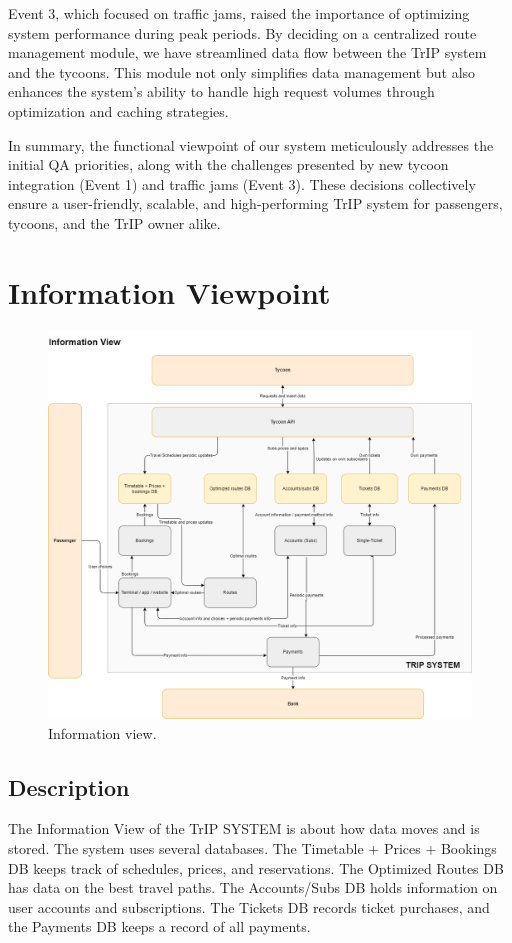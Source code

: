 Event 3, which focused on traffic jams, raised the importance of optimizing system performance during peak periods. By deciding on a centralized route management module, we have streamlined data flow between the TrIP system and the tycoons. This module not only simplifies data management but also enhances the system's ability to handle high request volumes through optimization and caching strategies.

In summary, the functional viewpoint of our system meticulously addresses the initial QA priorities, along with the challenges presented by new tycoon integration (Event 1) and traffic jams (Event 3). These decisions collectively ensure a user-friendly, scalable, and high-performing TrIP system for passengers, tycoons, and the TrIP owner alike.




\section{Information Viewpoint}

\begin{figure}[H]
    \centering
    \includegraphics[width=\textwidth]{drawings/views_final_version/information_view.png}
    \caption{Information view.}
    \label{fig:information_view}
\end{figure}

\subsection*{Description}
The Information View of the TrIP SYSTEM is about how data moves and is stored. The system uses several databases. The Timetable + Prices + Bookings DB keeps track of schedules, prices, and reservations. The Optimized Routes DB has data on the best travel paths. The Accounts/Subs DB holds information on user accounts and subscriptions. The Tickets DB records ticket purchases, and the Payments DB keeps a record of all payments.

